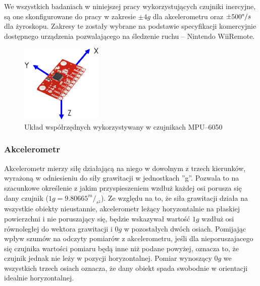 	We wszystkich badaniach w niniejszej pracy wykorzystujących czujniki inercyjne, są one skonfigurowane do pracy w zakresie  $\pm4g$ dla akcelerometru oraz $\pm500\degree/s$dla żyroskopu. Zakresy te zostały wybrane na podstawie specyfikacji komercyjnie dostępnego urządzenia pozwalającego na śledzenie ruchu -- Nintendo WiiRemote.
		
	\begin{figure}[!htp]
		\centering 
		\includegraphics[width=0.35\textwidth]{images/imuCoordinationSpace.eps}	
		\caption{Układ współrzędnych wykorzystywany w czujnikach MPU--6050}
		\label{fig:characteristics:imu:space}
	\end{figure}
		
		
	\subsubsection*{Akcelerometr}
	Akcelerometr mierzy siłę działającą na niego w dowolnym z trzech kierunków, wyrażoną w odniesieniu do siły grawitacji w jednostkach ''g''. Pozwala to na szacunkowe określenie z jakim przyspieszeniem wzdłuż każdej osi porusza się dany czujnik 
	($1g =9.80665^m/_{s^2}$). Ze względu na to, że siła grawitacji działa na wszystkie obiekty nieustannie, akcelerometr leżący horyzontalnie na płaskiej powierzchni i nie poruszający się, będzie wskazywał wartość $1g$ wzdłuż osi równoległej do wektora grawitacji i $0g$ w pozostałych dwóch osiach. Pomijając wpływ szumów na odczyty pomiarów z akcelerometru, jeśli dla nieporuszajacego się czujnika wartości pomiaru będą inne niż podane powyżej, oznacza to, że czujnik jednak nie leży w pozycji horyzontalnej. Pomiar wynoszący $0g$ we wszystkich trzech osiach oznacza, że dany obiekt spada swobodnie w orientacji idealnie horyzontalnej.\\
		

